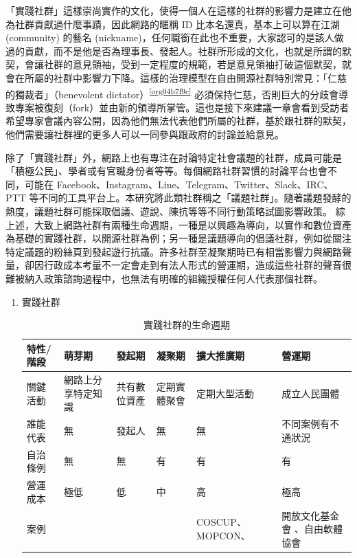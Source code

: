 \documentclass[12pt,a4paper]{article}
\begin{document}
\begin{enumerate}
「實踐社群」這樣崇尚實作的文化，使得一個人在這樣的社群的影響力是建立在他為社群貢獻過什麼事蹟，因此網路的暱稱 ID  比本名還真，基本上可以算在江湖 (community) 的藝名 (nickname)，任何職銜在此也不重要，大家認可的是該人做過的貢獻，而不是他是否為理事長、發起人。社群所形成的文化，也就是所謂的默契，會讓社群的意見領袖，受到一定程度的規範，若是意見領袖打破這個默契，就會在所屬的社群中影響力下降。這樣的治理模型在自由開源社群特別常見：「仁慈的獨裁者」（benevolent dictator）\textsuperscript{\ref{org04b7f9c}} 必須保持仁慈，否則巨大的分歧會導致專案被復刻（fork）並由新的領導所掌管。這也是接下來建議一章會看到受訪者希望專家會議內容公開，因為他們無法代表他們所屬的社群，基於跟社群的默契，他們需要讓社群裡的更多人可以一同參與跟政府的討論並給意見。

除了「實踐社群」外，網路上也有專注在討論特定社會議題的社群，成員可能是「積極公民」、學者或有官職身份者等等。每個網路社群習慣的討論平台也會不同，可能在 Facebook、Instagram、Line、Telegram、Twitter、Slack、IRC、PTT 等不同的工具平台上。本研究將此類社群稱之「議題社群」。隨著議題發酵的熱度，議題社群可能採取倡議、遊說、陳抗等等不同行動策略試圖影響政策。
綜上述，大致上網路社群有兩種生命週期，一種是以興趣為導向，以實作和數位資產為基礎的實踐社群，以開源社群為例；另一種是議題導向的倡議社群，例如從關注特定議題的粉絲頁到發起遊行抗議。許多社群至凝聚期時已有相當影響力與網路聲量，卻因行政成本考量不一定會走到有法人形式的營運期，造成這些社群的聲音很難被納入政策諮詢過程中，也無法有明確的組織授權任何人代表那個社群。
\begin{enumerate}
\item 實踐社群
\label{sec:org573e43a}
\begin{table}[htbp]
\caption{\label{tab:org1d6c79c}
實踐社群的生命週期}
\centering
{} \footnotesize \setlength{\tabcolsep}{3pt}
\begin{tabular}{lp{80pt}llp{86pt}p{86pt}}
\toprule
特性/階段 & 萌芽期 & 發起期 & 凝聚期 & 擴大推廣期 & 營運期\\
\midrule
關鍵活動 & 網路上分享特定知識 & 共有數位資產 & 定期實體聚會 & 定期大型活動 & 成立人民團體\\
誰能代表 & 無 & 發起人 & 無 & 無 & 不同案例有不通狀況\\
自治條例 & 無 & 無 & 有 & 有 & 有\\
營運成本 & 極低 & 低 & 中 & 高 & 極高\\
案例 &  &  &  & COSCUP、MOPCON、 & 開放文化基金會 、自由軟體協會\\
\bottomrule
\end{tabular}
\end{table}

\end{enumerate}
\end{enumerate}
\end{document}
